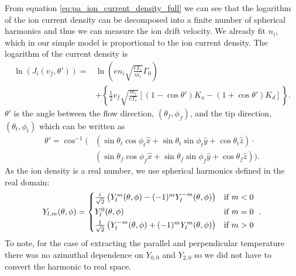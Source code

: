 From equation \ref{eq:pa_ion_current_density_full} we can see that the logarithm of the ion current density can be decomposed into a finite number of spherical harmonics and thus we can measure the ion drift velocity. We already fit $n_i$, which in our simple model is proportional to the ion current density. The logarithm of the current density is
\begin{align}
    \ln(J_i(v_f, \theta')) =& \ln\left(e n_i \sqrt{\frac{e T_e}{m_i}} \Gamma_0\right) \nonumber \\
    &+ \left\{\frac{1}{2} v_f \sqrt{\frac{m_i}{e T_e}} \left[(1 - \cos \theta') K_u - (1 + \cos \theta') K_d\right]\right\}.
    \label{eq:pa_log_ion_current_density}
\end{align}
$\theta'$ is the angle between the flow direction, $(\theta_f, \phi_f)$, and the tip direction, $(\theta_t, \phi_t)$ which can be written as
\begin{align*}
    \theta' = \cos^{-1}(&\left(\sin\theta_t \cos\phi_t \hat{x} + \sin\theta_t \sin\phi_t \hat{y} + \cos\theta_t \hat{z}\right) \cdot \\
    &\left(\sin\theta_f \cos\phi_f \hat{x} + \sin\theta_f \sin\phi_f \hat{y} + \cos\theta_f \hat{z}\right)).
\end{align*}
As the ion density is a real number, we use spherical harmonics defined in the real domain:
\begin{equation*}
    Y_{l,m}(\theta, \phi) = \begin{cases*}
        \frac{i}{\sqrt{2}} \left(Y_l^m(\theta, \phi) - (-1)^m Y_l^{-m}(\theta, \phi)\right) & if $m < 0$\\
        Y_l^0(\theta, \phi) & if $m = 0$\\
        \frac{1}{\sqrt{2}} \left(Y_l^{-m}(\theta, \phi) + (-1)^m Y_l^{m}(\theta, \phi)\right) & if $m > 0$
    \end{cases*}.
\end{equation*}
To note, for the case of extracting the parallel and perpendicular temperature there was no azimuthal dependence on $Y_{0,0}$ and $Y_{2,0}$ so we did not have to convert the harmonic to real space.

